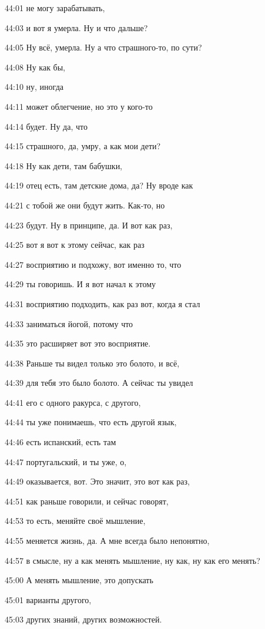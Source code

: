 44:01
не могу зарабатывать,

44:03
и вот я умерла. Ну и что дальше?

44:05
Ну всё, умерла. Ну а что страшного-то, по сути?

44:08
Ну как бы,

44:10
ну, иногда

44:11
может облегчение, но это у кого-то

44:14
будет. Ну да, что

44:15
страшного, да, умру, а как мои дети?

44:18
Ну как дети, там бабушки,

44:19
отец есть, там детские дома, да? Ну вроде как

44:21
с тобой же они будут жить. Как-то, но

44:23
будут. Ну в принципе, да. И вот как раз,

44:25
вот я вот к этому сейчас, как раз

44:27
восприятию и подхожу, вот именно то, что

44:29
ты говоришь. И я вот начал к этому

44:31
восприятию подходить, как раз вот, когда я стал

44:33
заниматься йогой, потому что

44:35
это расширяет вот это восприятие.

44:38
Раньше ты видел только это болото, и всё,

44:39
для тебя это было болото. А сейчас ты увидел

44:41
его с одного ракурса, с другого,

44:44
ты уже понимаешь, что есть другой язык,

44:46
есть испанский, есть там

44:47
португальский, и ты уже, о,

44:49
оказывается, вот. Это значит, это вот как раз,

44:51
как раньше говорили, и сейчас говорят,

44:53
то есть, меняйте своё мышление,

44:55
меняется жизнь, да. А мне всегда было непонятно,

44:57
в смысле, ну а как менять мышление, ну как, ну как его менять?

45:00
А менять мышление, это допускать

45:01
варианты другого,

45:03
других знаний, других возможностей.

